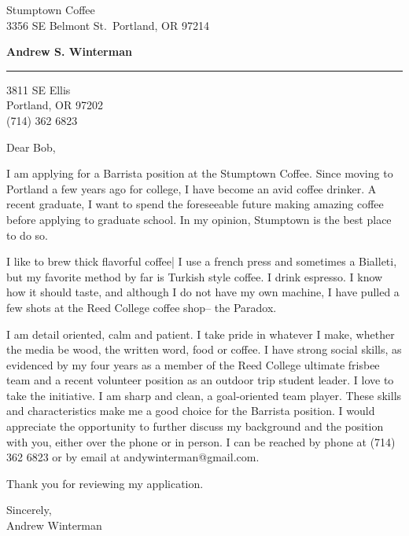 \documentclass[11pt]{letter} %
\begin{document}
\longindentation=0pt                       %
\let\raggedleft\raggedright                %
 
\begin{letter}{
Stumptown Coffee\\
3356 SE Belmont St.\
Portland, OR 97214\\}

\begin{center}
\large \bf{Andrew S. Winterman} \end{center}
\medskip\hrule height 1pt
\begin{center}
3811 SE Ellis \\ Portland, OR 97202 \\ (714) 362 6823
\end{center}  

\opening{Dear Bob,} 
 
 I am applying for a Barrista position at the Stumptown Coffee. Since moving to Portland a few years ago for college, I have become an avid coffee drinker. A recent graduate, I want to spend the foreseeable future making amazing coffee before applying to graduate school. In my opinion, Stumptown is the best place to do so. 

I like to brew thick flavorful coffee| I use a french press and sometimes a Bialleti, but my favorite method by far is Turkish style coffee. I drink espresso. I know how it should taste, and although I do not have my own machine, I have pulled a few shots at the Reed College coffee shop-- the Paradox. 

 I am detail oriented, calm and patient. I take pride in whatever I make, whether the media be wood, the written word, food or coffee. I have strong social skills, as evidenced by my four years as a member of the Reed College ultimate frisbee team and a recent volunteer position as an outdoor trip student leader. I love to take the initiative. I am sharp and clean, a goal-oriented team player. These skills and characteristics make me a good choice for the Barrista position. I would appreciate the opportunity to further discuss my background and the position with you, either over the phone or in person. I can be reached by phone at (714) 362 6823 or by email at andywinterman@gmail.com. 

Thank you for reviewing my application.

Sincerely, \\
Andrew Winterman

\end{letter}
 
\end{document}

